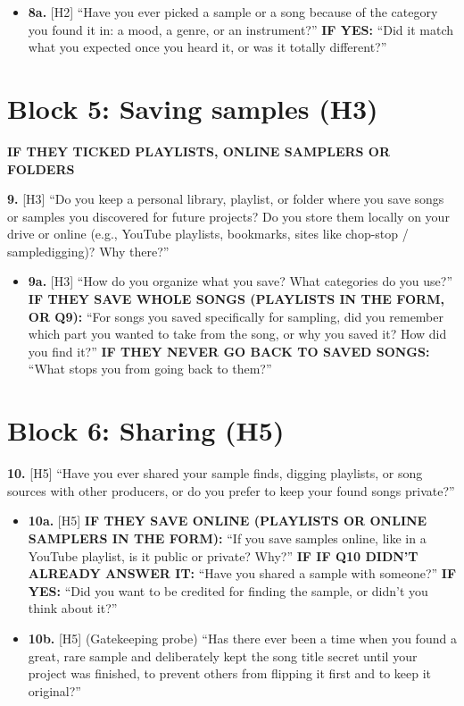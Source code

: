 \documentclass[12pt,a4paper]{report}
\newcommand{\cond}[1]{\textcolor{condition}{\textbf{#1}}}
\begin{document}
\begin{itemize}
  \item \textbf{8a.} [H2] “Have you ever picked a sample or a song because of the category you found it in: a mood, a genre, or an instrument?” \cond{IF YES:} “Did it match what you expected once you heard it, or was it totally different?”
\end{itemize}

\section{Block 5: Saving samples (H3)}

\cond{IF THEY TICKED PLAYLISTS, ONLINE SAMPLERS OR FOLDERS}

\textbf{9.} [H3] “Do you keep a personal library, playlist, or folder where you save songs or samples you discovered for future projects? Do you store them locally on your drive or online (e.g., YouTube playlists, bookmarks, sites like chop-stop / sampledigging)? Why there?”

\begin{itemize}
  \item \textbf{9a.} [H3] “How do you organize what you save? What categories do you use?” \cond{IF THEY SAVE WHOLE SONGS (PLAYLISTS IN THE FORM, OR Q9):} “For songs you saved specifically for sampling, did you remember which part you wanted to take from the song, or why you saved it? How did you find it?” \cond{IF THEY NEVER GO BACK TO SAVED SONGS:} “What stops you from going back to them?”
\end{itemize}

\section{Block 6: Sharing (H5)}

\textbf{10.} [H5] “Have you ever shared your sample finds, digging playlists, or song sources with other producers, or do you prefer to keep your found songs private?”

\begin{itemize}
  \item \textbf{10a.} [H5] \cond{IF THEY SAVE ONLINE (PLAYLISTS OR ONLINE SAMPLERS IN THE FORM):} “If you save samples online, like in a YouTube playlist, is it public or private? Why?” \cond{IF IF Q10 DIDN’T ALREADY ANSWER IT:} “Have you shared a sample with someone?” \cond{IF YES:} “Did you want to be credited for finding the sample, or didn’t you think about it?”
  \item \textbf{10b.} [H5] (Gatekeeping probe) “Has there ever been a time when you found a great, rare sample and deliberately kept the song title secret until your project was finished, to prevent others from flipping it first and to keep it original?”
\end{itemize}
\end{document}
